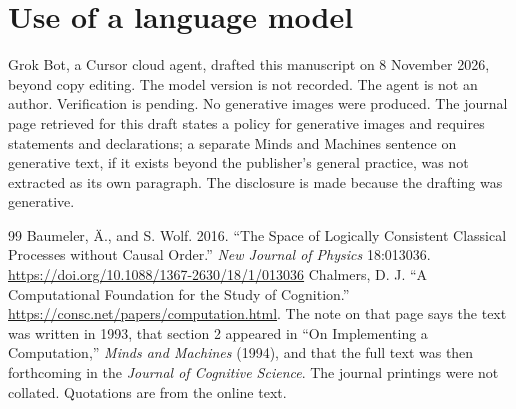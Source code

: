 \documentclass[11pt]{article}
\begin{document}
\section*{Use of a language model}
Grok Bot, a Cursor cloud agent, drafted this manuscript on 8 November 2026, beyond copy editing. The model version is not recorded. The agent is not an author. Verification is pending. No generative images were produced. The journal page retrieved for this draft states a policy for generative images and requires statements and declarations; a separate Minds and Machines sentence on generative text, if it exists beyond the publisher's general practice, was not extracted as its own paragraph. The disclosure is made because the drafting was generative.

\begin{thebibliography}{99}
 Baumeler, \"A., and S. Wolf. 2016. ``The Space of Logically Consistent Classical Processes without Causal Order.'' \textit{New Journal of Physics} 18:013036. \url{https://doi.org/10.1088/1367-2630/18/1/013036}
 Chalmers, D. J. ``A Computational Foundation for the Study of Cognition.'' \url{https://consc.net/papers/computation.html}. The note on that page says the text was written in 1993, that section 2 appeared in ``On Implementing a Computation,'' \textit{Minds and Machines} (1994), and that the full text was then forthcoming in the \textit{Journal of Cognitive Science}. The journal printings were not collated. Quotations are from the online text.
\end{thebibliography}
\end{document}
